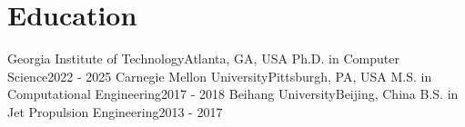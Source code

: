\section{Education}
  \resumeSubHeadingListStart
  \resumeSubheading
      {Georgia Institute of Technology}{Atlanta, GA, USA}
      {Ph.D. in Computer Science}{2022 - 2025}
    \resumeSubheading
      {Carnegie Mellon University}{Pittsburgh, PA, USA}
      {M.S. in Computational Engineering}{2017 - 2018}
    \resumeSubheading
      {Beihang University}{Beijing, China}
      {B.S. in Jet Propulsion Engineering}{2013 - 2017}
  \resumeSubHeadingListEnd